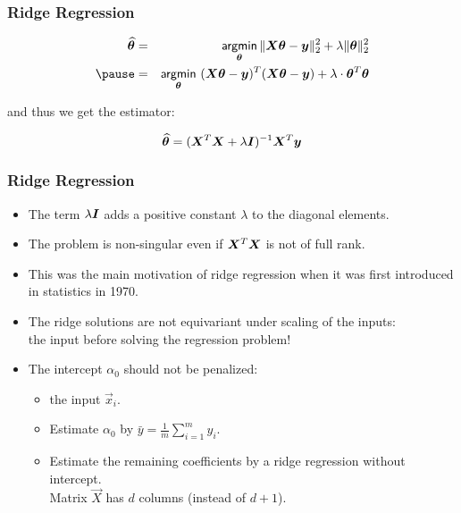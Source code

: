 \begin{frame}
	\frametitle{Ridge Regression \cont}


	\begin{eqnarray*}
		\widehat{\vec\theta}
		&=& \argmin_{\vec\theta} \| \mat{X} \vec\theta - \vec y \|^2_2 + \lambda \|\vec\theta\|^2_2 \\ \pause
		&=& \argmin_{\vec\theta} \ (\mat{X} \vec\theta - \vec y)^T (\mat{X} \vec\theta-\vec y) +
		\lambda \cdot \vec\theta^T\vec \theta
	\end{eqnarray*}
	\pause

	and thus we get the estimator:

	\begin{displaymath}
		\widehat{{\bm \theta}} = ({\bm X}^T{\bm X}+\lambda {\bm I})^{-1}{\bm X}^T{\bm y}
	\end{displaymath}
\end{frame}


\begin{frame}
	\frametitle{Ridge Regression \cont}


	\begin{itemize}
		\item The term $\lambda {\bm I}$ adds a positive constant $\lambda$ to the diagonal elements.
		\item The problem is non-singular even if ${\bm X}^T {\bm X}$ is not of full rank. \\
		\item This was the main motivation of ridge regression when it was first introduced in statistics in 1970. \\[.25cm] \pause
		\item The ridge solutions are not equivariant under scaling of the inputs: \\
		       the input before solving the regression problem! \\[.25cm] \pause
		\item The intercept $\alpha_0$ should not be penalized:
		      \begin{itemize}
			      \item {} the input $\vec{x}_i$.
			      \item Estimate $\alpha_0$ by $\bar{y} = \frac{1}{m} \sum_{i=1}^m y_i$.
			      \item Estimate the remaining coefficients by a ridge regression without  intercept. \\
			            Matrix $\vec{X}$ has $d$ columns (instead of $d+1$).
		      \end{itemize}
	\end{itemize}
\end{frame}


